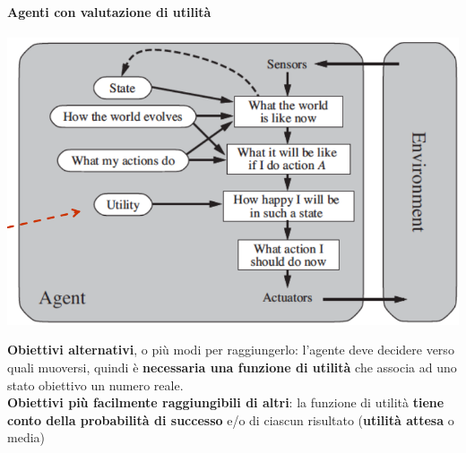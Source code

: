 \documentclass[10pt]{book}
\begin{document}
\paragraph{Agenti con valutazione di utilità}
\begin{center}
	\includegraphics[scale=0.5]{agvalutazutilita.png}
\end{center}
\textbf{Obiettivi alternativi}, o più modi per raggiungerlo: l'agente deve decidere verso quali muoversi, quindi è \textbf{necessaria una funzione di utilità} che associa ad uno stato obiettivo un numero reale.\\
\textbf{Obiettivi più facilmente raggiungibili di altri}: la funzione di utilità \textbf{tiene conto della probabilità di successo} e/o di ciascun risultato (\textbf{utilità attesa} o media)
\end{document}
